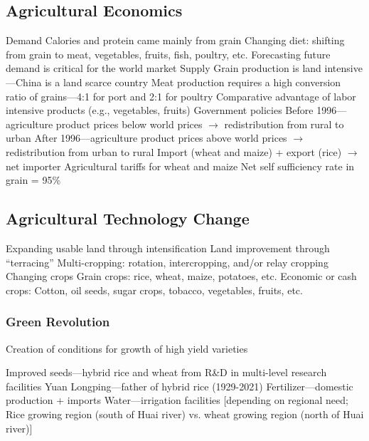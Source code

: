 \documentclass[11pt]{article}
\theoremstyle{definition}
\theoremstyle{remark}
\begin{document}
\subsection{Agricultural Economics}
\begin{outline}[enumerate]
\1 Demand
	\2 Calories and protein came mainly from grain
	\2 Changing diet: shifting from grain to meat, vegetables, fruits, fish, poultry, etc.
	\2 Forecasting future demand is critical for the world market
\1 Supply
	\2 Grain production is land intensive---China is a land scarce country
	\2 Meat production requires a high conversion ratio of grains---4:1 for port and 2:1 for poultry
	\2 Comparative advantage of labor intensive products (e.g., vegetables, fruits)
\1 Government policies
	\2 Before 1996---agriculture product prices below world prices $\to$ redistribution from rural to urban
	\2 After 1996---agriculture product prices above world prices $\to$ redistribution from urban to rural
\1 Import (wheat and maize) + export (rice) $\to$ net importer
	\2 Agricultural tariffs for wheat and maize
\1 Net self sufficiency rate in grain = 95\%
\end{outline}

\subsection{Agricultural Technology Change}
\begin{outline}[enumerate]
\1 Expanding usable land through intensification
	\2 Land improvement through ``terracing''
	\2 Multi-cropping: rotation, intercropping, and/or relay cropping
\1 Changing crops
	\2 Grain crops: rice, wheat, maize, potatoes, etc.
	\2 Economic or cash crops: Cotton, oil seeds, sugar crops, tobacco, vegetables, fruits, etc.
\end{outline}

\subsubsection{Green Revolution}
Creation of conditions for growth of high yield varieties
\begin{outline}[enumerate]
\1 Improved seeds---hybrid rice and wheat from R\&D in multi-level research facilities
	\2 Yuan Longping---father of hybrid rice (1929-2021)
\1 Fertilizer---domestic production + imports
\1 Water---irrigation facilities [depending on regional need; Rice growing region (south of Huai river) vs. wheat growing region (north of Huai river)]
\end{outline}
\end{document}
